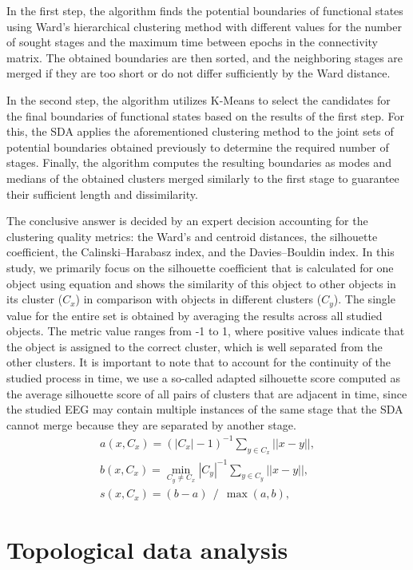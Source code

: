 \documentclass[10pt]{iopart}
\begin{document}
In the first step, the algorithm finds the potential boundaries of functional states using Ward's hierarchical clustering method with different values for the number of sought stages and the maximum time between epochs in the connectivity matrix. The obtained boundaries are then sorted, and the neighboring stages are merged if they are too short or do not differ sufficiently by the Ward distance.

In the second step, the algorithm utilizes K-Means to select the candidates for the final boundaries of functional states based on the results of the first step. For this, the SDA applies the aforementioned clustering method to the joint sets of potential boundaries obtained previously to determine the required number of stages. Finally, the algorithm computes the resulting boundaries as modes and medians of the obtained clusters merged similarly to the first stage to guarantee their sufficient length and dissimilarity.

The conclusive answer is decided by an expert decision accounting for the clustering quality metrics: the Ward's and centroid distances, the silhouette coefficient, the Calinski--Harabasz index, and the Davies--Bouldin index. In this study, we primarily focus on the silhouette coefficient that is calculated for one object using equation  and shows the similarity of this object to other objects in its cluster ($C_x$) in comparison with objects in different clusters ($C_y$). The single value for the entire set is obtained by averaging the results across all studied objects. The metric value ranges from -1 to 1, where positive values indicate that the object is assigned to the correct cluster, which is well separated from the other clusters. It is important to note that to account for the continuity of the studied process in time, we use a so-called adapted silhouette score computed as the average silhouette score of all pairs of clusters that are adjacent in time, since the studied EEG may contain multiple instances of the same stage that the SDA cannot merge because they are separated by another stage.
\begin{eqnarray}
    a(x, C_x) = {(|C_x| - 1)} ^ {-1} \sum_{y \in C_x} ||x - y||, \nonumber\\
    b(x, C_x) = \min_{C_y \ne C_x} {|C_y|} ^ {-1} \sum_{y \in C_y} ||x - y||, \nonumber\\
    s(x, C_x) = (b - a)~~/~~\max(a, b), \label{eq1}
\end{eqnarray}

\section{Topological data analysis}
\end{document}
